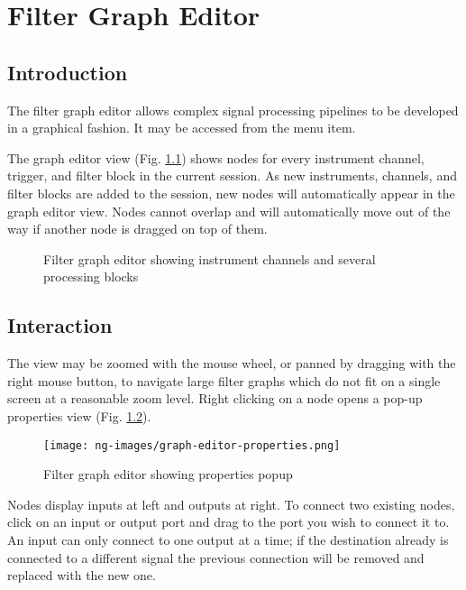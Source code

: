 \chapter{Filter Graph Editor}
\label{grapheditor}

\section{Introduction}

The filter graph editor allows complex signal processing pipelines to be developed in a graphical fashion. It may be
accessed from the  menu item.

The graph editor view (Fig. \ref{graph-editor}) shows nodes for every instrument channel, trigger, and filter block in
the current session. As new instruments, channels, and filter blocks are added to the session, new nodes will
automatically appear in the graph editor view. Nodes cannot overlap and will automatically move out of the way if
another node is dragged on top of them.

\begin{figure}[H]
\centering
{}
\caption{Filter graph editor showing instrument channels and several processing blocks}
\label{graph-editor}
\end{figure}

\section{Interaction}

The view may be zoomed with the mouse wheel, or panned by dragging with the right mouse button, to navigate large
filter graphs which do not fit on a single screen at a reasonable zoom level. Right clicking on a node opens a pop-up
properties view (Fig. \ref{graph-editor-properties}).

\begin{figure}[H]
\centering
\texttt{[image: ng-images/graph-editor-properties.png]}
\caption{Filter graph editor showing properties popup}
\label{graph-editor-properties}
\end{figure}

Nodes display inputs at left and outputs at right. To connect two existing nodes, click on an input or output port and
drag to the port you wish to connect it to. An input can only connect to one output at a time; if the destination
already is connected to a different signal the previous connection will be removed and replaced with the new one.


